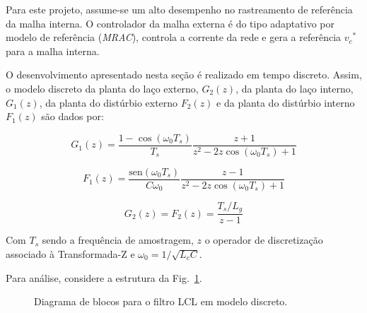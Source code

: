     Para este projeto, assume-se um alto desempenho no rastreamento de referência
    da malha interna. O controlador da malha externa é do tipo adaptativo por modelo
    de referência (\textit{MRAC}), controla a corrente da rede e gera a referência
    ${v_c}^*$ para a malha interna.

    O desenvolvimento apresentado nesta seção é realizado em tempo discreto. Assim,
    o modelo discreto da planta do laço externo, $G_2 (z)$, da planta do laço interno,
    $G_1 (z)$, da planta do distúrbio externo $F_2(z)$ e da planta do distúrbio interno
    $F_1(z)$ são dados por:

    \begin{equation}
        G_1(z) = \frac{1 - \cos(\omega_0 T_s)}{T_s} \frac{z + 1}{z^2 - 2z \cos(\omega_0 T_s) + 1}
    \end{equation}

    \begin{equation}
        F_1(z) = \frac{\text{sen}(\omega_0 T_s)}{C \omega_0} \frac{z - 1}{z^2 - 2z \cos(\omega_0 T_s) + 1}
    \end{equation}

    \begin{equation}
        G_2(z) = F_2(z) = \frac{T_s / L_g}{z - 1}
        \label{eq:g_2_discreta}
    \end{equation}

    Com $T_s$ sendo a frequência de amostragem, $z$ o operador de discretização
    associado à Transformada-Z e $\omega_0 = 1 / \sqrt{L_c C}$.

    Para análise, considere a estrutura da Fig.~\ref{fig:LCL_discreto}.

    \begin{figure}[htb]
        \renewcommand\figurename{Fig.}
        \caption{Diagrama de blocos para o filtro LCL em modelo discreto.}
        \label{fig:LCL_discreto}
    \end{figure}

